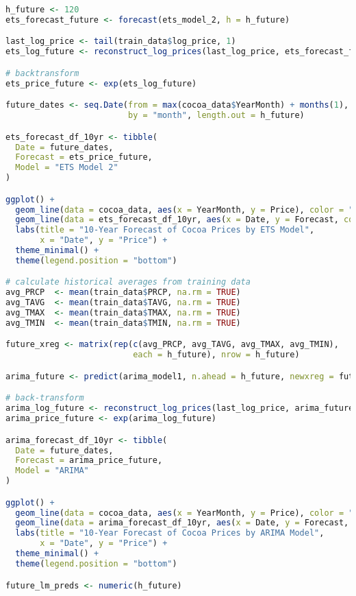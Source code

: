 \documentclass[10pt]{article}
\begin{document}
\begin{lstlisting}[language=R, caption=Forecast]
h_future <- 120
ets_forecast_future <- forecast(ets_model_2, h = h_future)

last_log_price <- tail(train_data$log_price, 1)
ets_log_future <- reconstruct_log_prices(last_log_price, ets_forecast_future$mean)

# backtransform
ets_price_future <- exp(ets_log_future)

future_dates <- seq.Date(from = max(cocoa_data$YearMonth) + months(1),
                         by = "month", length.out = h_future)

ets_forecast_df_10yr <- tibble(
  Date = future_dates,
  Forecast = ets_price_future,
  Model = "ETS Model 2"
)

ggplot() +
  geom_line(data = cocoa_data, aes(x = YearMonth, y = Price), color = "black", linewidth = 1.2) +
  geom_line(data = ets_forecast_df_10yr, aes(x = Date, y = Forecast, color = Model, linetype = Model), linewidth = 1.2) +
  labs(title = "10-Year Forecast of Cocoa Prices by ETS Model",
       x = "Date", y = "Price") +
  theme_minimal() +
  theme(legend.position = "bottom")

# calculate historical averages from training data
avg_PRCP  <- mean(train_data$PRCP, na.rm = TRUE)
avg_TAVG  <- mean(train_data$TAVG, na.rm = TRUE)
avg_TMAX  <- mean(train_data$TMAX, na.rm = TRUE)
avg_TMIN  <- mean(train_data$TMIN, na.rm = TRUE)

future_xreg <- matrix(rep(c(avg_PRCP, avg_TAVG, avg_TMAX, avg_TMIN),
                          each = h_future), nrow = h_future)

arima_future <- predict(arima_model1, n.ahead = h_future, newxreg = future_xreg)

# back-transform
arima_log_future <- reconstruct_log_prices(last_log_price, arima_future$pred)
arima_price_future <- exp(arima_log_future)

arima_forecast_df_10yr <- tibble(
  Date = future_dates,
  Forecast = arima_price_future,
  Model = "ARIMA"
)

ggplot() +
  geom_line(data = cocoa_data, aes(x = YearMonth, y = Price), color = "black", linewidth = 1.2) +
  geom_line(data = arima_forecast_df_10yr, aes(x = Date, y = Forecast, color = Model, linetype = Model), linewidth = 1.2) +
  labs(title = "10-Year Forecast of Cocoa Prices by ARIMA Model",
       x = "Date", y = "Price") +
  theme_minimal() +
  theme(legend.position = "bottom")

future_lm_preds <- numeric(h_future)


\end{lstlisting}
\end{document}
